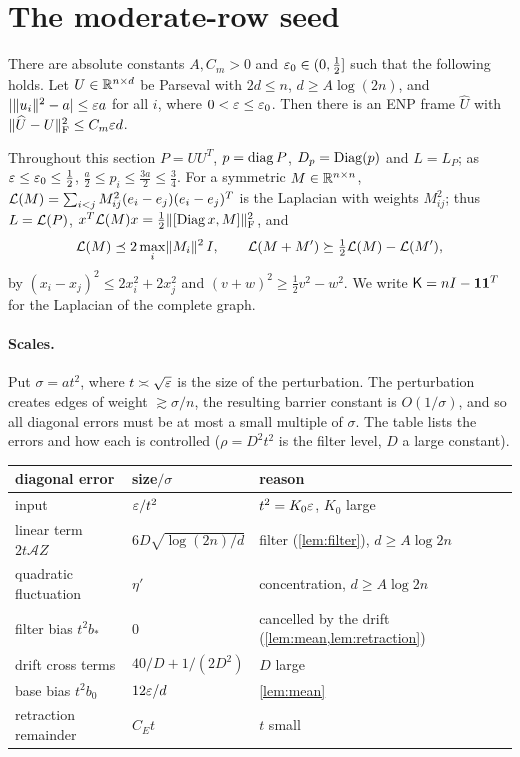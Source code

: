 \section{The moderate-row seed}\label{sec:moderate}

\begin{theorem}\label{thm:moderate}
There are absolute constants $A,C_m>0$ and $\varepsilon_0\in(0,\frac12]$ such that the
following holds. Let $U\in\mathbb R^{n\times d}$ be Parseval with $2d\le n$, $d\ge A\log(2n)$, and
$|\lVert u_i\rVert^2-a|\le\varepsilon a$ for all $i$, where $0<\varepsilon\le\varepsilon_0$. Then there is
an ENP frame $\widehat U$ with $\lVert \widehat U-U\rVert_{\mathrm F}^2\le C_m\varepsilon d$.
\end{theorem}

Throughout this section $P=UU^T$, $p=\operatorname{diag} P$, $D_p=\operatorname{Diag}(p)$ and $L=L_P$; as
$\varepsilon\le\varepsilon_0\le\frac12$, $\frac a2\le p_i\le\frac{3a}2\le\frac34$. For a symmetric
$M\in\mathbb R^{n\times n}$, $\mathcal L(M)=\sum_{i<j}M_{ij}^2(e_i-e_j)(e_i-e_j)^T$ is the
Laplacian with weights $M_{ij}^2$; thus $L=\mathcal L(P)$,
$x^T\mathcal L(M)x=\frac12\lVert [\operatorname{Diag} x,M]\rVert_{\mathrm F}^2$, and
\begin{equation}\label{eq:lap-basic}
 \mathcal L(M)\preceq2\max_i\lVert M_i\rVert^2\,I,\qquad
 \mathcal L(M+M')\succeq\tfrac12\mathcal L(M)-\mathcal L(M'),
\end{equation}
by $(x_i-x_j)^2\le2x_i^2+2x_j^2$ and $(v+w)^2\ge\frac12v^2-w^2$. We write
$\mathsf K=nI-\mathbf 1\mathbf 1^T$ for the Laplacian of the complete graph.

\paragraph{Scales.} Put $\sigma=at^2$, where $t\asymp\sqrt{\varepsilon}$ is the size of
the perturbation. The perturbation creates edges of weight $\gtrsim\sigma/n$,
the resulting barrier constant is $O(1/\sigma)$, and so all diagonal errors must
be at most a small multiple of $\sigma$. The table lists the errors and how
each is controlled ($\rho=D^2t^2$ is the filter level, $D$ a large constant).
\begin{center}
\small
\begin{tabular}{@{}lll@{}}
\toprule
diagonal error & size$/\sigma$ & reason\\
\midrule
input & $\varepsilon/t^2$ & $t^2=K_0\varepsilon$, $K_0$ large\\
linear term $2t\mathcal AZ$ & $6D\sqrt{\log(2n)/d}$ & filter (\cref{lem:filter}), $d\ge A\log 2n$\\
quadratic fluctuation & $\eta'$ & concentration, $d\ge A\log 2n$\\
filter bias $t^2b_*$ & $0$ & cancelled by the drift (\cref{lem:mean,lem:retraction})\\
drift cross terms & $40/D+1/(2D^2)$ & $D$ large\\
base bias $t^2b_0$ & $12\varepsilon/d$ & \cref{lem:mean}\\
retraction remainder & $C_Et$ & $t$ small\\
\bottomrule
\end{tabular}
\end{center}

